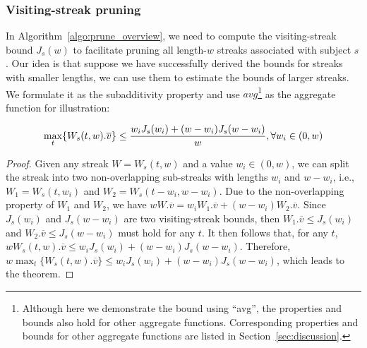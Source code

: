 \subsubsection{Visiting-streak pruning}  
\label{sec:visiting-window-bound}
In Algorithm~\ref{algo:prune_overview}, we need to compute the visiting-streak bound $J_s(w)$ to facilitate pruning all length-$w$ streaks associated with subject $s$. Our idea is that suppose we have successfully derived the bounds for streaks with smaller lengths, we can use them to estimate the bounds of larger streaks. We formulate it as the subadditivity property and use $avg$\footnote{Although here we demonstrate the bound
using ``avg'', the properties and bounds also hold for other aggregate functions. Corresponding properties and bounds for other aggregate functions are listed in Section~\ref{sec:discussion}.
} as the aggregate function for illustration: 

\begin{theorem}
\label{lem:subaverage}
\begin{equation}
\small
\label{eq:subadditivity}
	\max_t\{W_s(t,w).\overline{v}\} \leq \frac{w_i J_s(w_i) + (w-w_i) J_s(w-w_i)}{w}, \forall w_i \in (0,w)
\end{equation}
\end{theorem}
\begin{proof}
Given any streak $W=W_s(t,w)$ and a value $w_i \in (0,w)$, we can split the streak into two non-overlapping sub-streaks with lengths $w_i$ and $w-w_i$, i.e., $W_1 = W_s(t,w_i)$ and $W_2 = W_s(t-w_i, w-w_i)$. Due to the non-overlapping property of $W_1$ and $W_2$, we have $wW.\overline{v} = w_iW_1.\overline{v} + (w-w_i)W_2.\overline{v}$.  Since $J_s(w_i)$ and $J_s(w-w_i)$ are two visiting-streak bounds, then $W_1.\overline{v}\leq J_s(w_i)$ and $W_2.\overline{v}\leq J_s(w-w_i)$ must hold for any $t$. 
It then follows that, for any $t$, $wW_s(t,w).\overline{v} \leq w_i J_s(w_i) + (w-w_i) J_s(w-w_i)$. Therefore, $w\max_t\{W_s(t,w).\overline{v}\} \leq w_i J_s(w_i) + (w-w_i) J_s(w-w_i)$,  which leads to the theorem. %
\end{proof}





